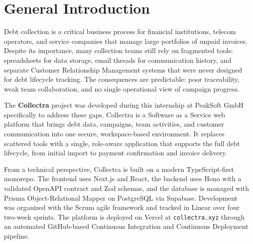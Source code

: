 \documentclass[12pt,a4paper]{report}
\begin{document}
\clearpage


\hypersetup{linkcolor=black, urlcolor=black, citecolor=black}
\tableofcontents
\clearpage


\listoffigures
\clearpage


\listoftables
\clearpage
\hypersetup{linkcolor=blue, urlcolor=blue, citecolor=blue}

\chapter*{General Introduction}
{}

Debt collection is a critical business process for financial institutions, telecom
operators, and service companies that manage large portfolios of unpaid invoices.
Despite its importance, many collection teams still rely on fragmented tools:
spreadsheets for data storage, email threads for communication history, and separate
Customer Relationship Management systems that were never designed for debt lifecycle tracking.
The consequences are predictable: poor traceability, weak team collaboration, and no
single operational view of campaign progress.

The \textbf{Collectra} project was developed during this internship at PeakSoft GmbH
specifically to address these gaps.
Collectra is a Software as a Service web platform that brings debt data, campaigns, team activities,
and customer communication into one secure, workspace-based environment.
It replaces scattered tools with a single, role-aware application that supports the
full debt lifecycle, from initial import to payment confirmation and invoice delivery.

From a technical perspective, Collectra is built on a modern TypeScript-first monorepo.
The frontend uses Next.js and React, the backend uses Hono with a validated OpenAPI
contract and Zod schemas, and the database is managed with Prisma Object-Relational Mapper on PostgreSQL
via Supabase.
Development was organized with the Scrum agile framework and tracked in Linear over
four two-week sprints.
The platform is deployed on Vercel at \texttt{collectra.xyz} through an automated
GitHub-based Continuous Integration and Continuous Deployment pipeline.
\end{document}
